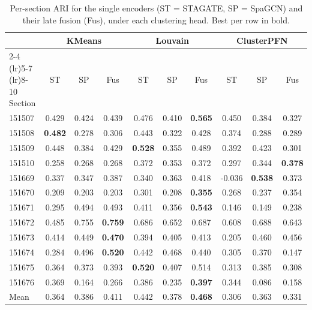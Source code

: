 \begin{table}[htbp]
  \centering
  \caption{Per-section ARI for the single encoders (ST = STAGATE, SP = SpaGCN)
  and their late fusion (Fus), under each clustering head. Best per row in bold.}
  \label{tab:fusion-persection}
  \small
  \setlength{\tabcolsep}{4pt}
  \begin{tabular}{l ccc ccc ccc}
    \toprule
    & \multicolumn{3}{c}{KMeans} & \multicolumn{3}{c}{Louvain} & \multicolumn{3}{c}{ClusterPFN} \\
    \cmidrule(lr){2-4} \cmidrule(lr){5-7} \cmidrule(lr){8-10}
    Section & ST & SP & Fus & ST & SP & Fus & ST & SP & Fus \\
    \midrule
    151507 & 0.429 & 0.424 & 0.439 & 0.476 & 0.410 & \textbf{0.565} & 0.450 & 0.384 & 0.327 \\
    151508 & \textbf{0.482} & 0.278 & 0.306 & 0.443 & 0.322 & 0.428 & 0.374 & 0.288 & 0.289 \\
    151509 & 0.448 & 0.384 & 0.429 & \textbf{0.528} & 0.355 & 0.489 & 0.392 & 0.423 & 0.301 \\
    151510 & 0.258 & 0.268 & 0.268 & 0.372 & 0.353 & 0.372 & 0.297 & 0.344 & \textbf{0.378} \\
    151669 & 0.337 & 0.347 & 0.387 & 0.340 & 0.363 & 0.418 & -0.036 & \textbf{0.538} & 0.373 \\
    151670 & 0.209 & 0.203 & 0.203 & 0.301 & 0.208 & \textbf{0.355} & 0.268 & 0.237 & 0.354 \\
    151671 & 0.295 & 0.494 & 0.493 & 0.411 & 0.356 & \textbf{0.543} & 0.146 & 0.149 & 0.238 \\
    151672 & 0.485 & 0.755 & \textbf{0.759} & 0.686 & 0.652 & 0.687 & 0.608 & 0.688 & 0.643 \\
    151673 & 0.414 & 0.449 & \textbf{0.470} & 0.394 & 0.405 & 0.413 & 0.205 & 0.460 & 0.456 \\
    151674 & 0.284 & 0.496 & \textbf{0.520} & 0.442 & 0.468 & 0.440 & 0.305 & 0.370 & 0.147 \\
    151675 & 0.364 & 0.373 & 0.393 & \textbf{0.520} & 0.407 & 0.514 & 0.313 & 0.385 & 0.308 \\
    151676 & 0.369 & 0.164 & 0.266 & 0.386 & 0.235 & \textbf{0.397} & 0.344 & 0.086 & 0.158 \\
    \midrule
    Mean & 0.364 & 0.386 & 0.411 & 0.442 & 0.378 & \textbf{0.468} & 0.306 & 0.363 & 0.331 \\
    \bottomrule
  \end{tabular}
\end{table}